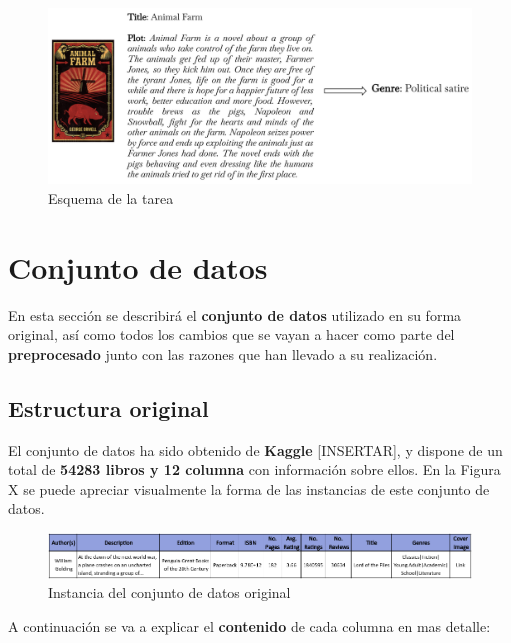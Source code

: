 \documentclass[12pt,a4paper, xcolor=table]{article}
\begin{document}
\vspace{12mm}

  \begin{figure}[!h]
    \centering
    \includegraphics[width=450px]{img/Animal Farm.png}
    \caption{Esquema de la tarea}
    \end{figure}

\newpage

\section{Conjunto de datos}
    En esta sección se describirá el \textbf{conjunto de datos} utilizado en su forma original, así como todos los cambios que se vayan a hacer como parte del \textbf{preprocesado} junto con las razones que han llevado a su realización.

    \subsection{Estructura original}
    El conjunto de datos ha sido obtenido de \textbf{Kaggle} [INSERTAR], y dispone de un total de \textbf{54283 libros y 12 columna} con información sobre ellos. En la Figura X se puede apreciar visualmente la forma de las instancias de este conjunto de datos.

    \vspace{3mm}

    \begin{figure}[!h]
        \centering
        \includegraphics[width=450px]{img/instancia_dataset_original.png}
        \caption{Instancia del conjunto de datos original}
    \end{figure}

    \vspace{3mm}

    A continuación se va a explicar el \textbf{contenido} de cada columna en mas detalle:
\end{document}

